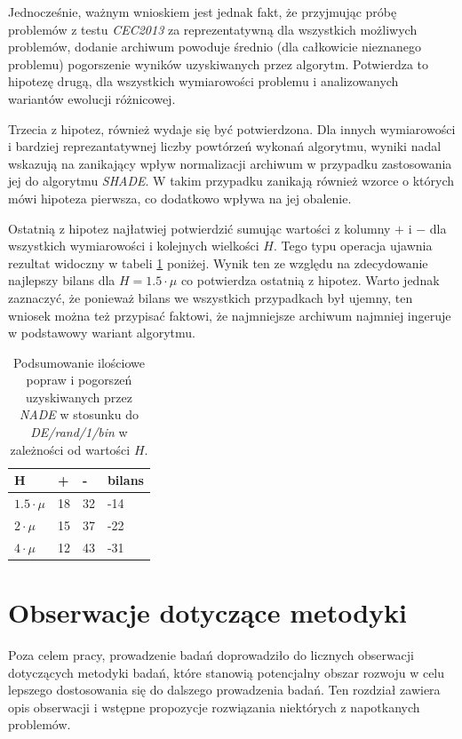 \documentclass[12pt,a4paper]{report}
\begin{document}
{{{{{{\par{
Jednocześnie, ważnym wnioskiem jest jednak fakt, że przyjmując próbę problemów z testu \emph{CEC2013} za reprezentatywną dla wszystkich możliwych problemów, dodanie archiwum powoduje średnio (dla całkowicie nieznanego problemu) pogorszenie wyników uzyskiwanych przez algorytm. Potwierdza to hipotezę drugą, dla wszystkich wymiarowości problemu i analizowanych wariantów ewolucji różnicowej.
}
\par{
Trzecia z hipotez, również wydaje się być potwierdzona. Dla innych wymiarowości i bardziej reprezantatywnej liczby powtórzeń wykonań algorytmu, wyniki nadal wskazują na zanikający wpływ normalizacji archiwum w przypadku zastosowania jej do algorytmu \emph{SHADE}. W takim przypadku zanikają również wzorce o których mówi hipoteza pierwsza, co dodatkowo wpływa na jej obalenie.
}
\par{
Ostatnią z hipotez najłatwiej potwierdzić sumując wartości z kolumny $+$ i $-$ dla wszystkich wymiarowości i kolejnych wielkości $H$. Tego typu operacja ujawnia rezultat widoczny w tabeli \ref{FULLSUMSUM} poniżej. Wynik ten ze względu na zdecydowanie najlepszy bilans dla $H = 1.5 \cdot \mu$ co potwierdza ostatnią z hipotez. Warto jednak zaznaczyć, że ponieważ bilans we wszystkich przypadkach był ujemny, ten wniosek można też przypisać faktowi, że najmniejsze archiwum najmniej ingeruje w podstawowy wariant algorytmu.
}

\begin{table}[h]
\centering
\caption{Podsumowanie ilościowe popraw i pogorszeń uzyskiwanych przez \emph{NADE} w stosunku do \emph{DE/rand/1/bin} w zależności od wartości $H$.}
\label{FULLSUMSUM}
\begin{tabular}{|l|l|l|l|}
\hline
{\bf H}               & {\bf +} & {\bf -} & {\bf bilans} \\ \hline
{\bf $1.5 \cdot \mu$} & 18       & 32       & -14            \\ \hline
{\bf $2 \cdot \mu$}   & 15       & 37       & -22            \\ \hline
{\bf $4 \cdot \mu$}   & 12       & 43       & -31            \\ \hline
\end{tabular}
\end{table}

\chapter{Obserwacje dotyczące metodyki}
\label{metodyka}
\par{
Poza celem pracy, prowadzenie badań doprowadziło do licznych obserwacji dotyczących metodyki badań, które stanowią potencjalny obszar rozwoju w celu lepszego dostosowania się do dalszego prowadzenia badań. Ten rozdział zawiera opis obserwacji i wstępne propozycje rozwiązania niektórych z napotkanych problemów.
}
}}}}}}
\end{document}
